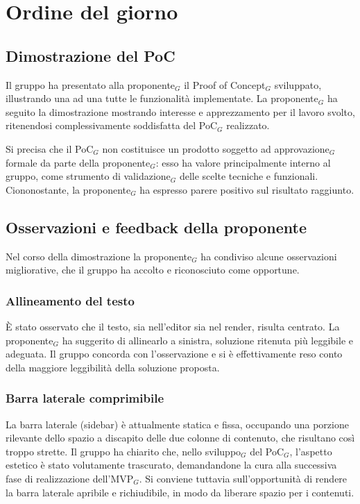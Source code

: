 \documentclass[a4paper, 10pt, colorlinks=true, linkcolor=black, urlcolor=blue, citecolor=blue, hidelinks]{article}
\begin{document}
\section{Ordine del giorno}

\subsection{Dimostrazione del PoC}
Il gruppo ha presentato alla proponente$_G$ il Proof of Concept$_G$ sviluppato, illustrando una ad una tutte le funzionalità implementate. La proponente$_G$ ha seguito la dimostrazione mostrando interesse e apprezzamento per il lavoro svolto, ritenendosi complessivamente soddisfatta del PoC$_G$ realizzato.

Si precisa che il PoC$_G$ non costituisce un prodotto soggetto ad approvazione$_G$ formale da parte della proponente$_G$: esso ha valore principalmente interno al gruppo, come strumento di validazione$_G$ delle scelte tecniche e funzionali. Ciononostante, la proponente$_G$ ha espresso parere positivo sul risultato raggiunto.

\subsection{Osservazioni e feedback della proponente}
Nel corso della dimostrazione la proponente$_G$ ha condiviso alcune osservazioni migliorative, che il gruppo ha accolto e riconosciuto come opportune.

\subsubsection{Allineamento del testo}
È stato osservato che il testo, sia nell'editor sia nel render, risulta centrato. La proponente$_G$ ha suggerito di allinearlo a sinistra, soluzione ritenuta più leggibile e adeguata. Il gruppo concorda con l'osservazione e si è effettivamente reso conto della maggiore leggibilità della soluzione proposta.

\subsubsection{Barra laterale comprimibile}
La barra laterale (sidebar) è attualmente statica e fissa, occupando una porzione rilevante dello spazio a discapito delle due colonne di contenuto, che risultano così troppo strette. Il gruppo ha chiarito che, nello sviluppo$_G$ del PoC$_G$, l'aspetto estetico è stato volutamente trascurato, demandandone la cura alla successiva fase di realizzazione dell'MVP$_G$. Si conviene tuttavia sull'opportunità di rendere la barra laterale apribile e richiudibile, in modo da liberare spazio per i contenuti.
\end{document}
